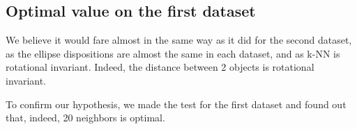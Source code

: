\subsection{Optimal value on the first dataset}
We believe it would fare almost in the same way as it did for the second dataset, as the ellipse dispositions are almost the same in each dataset, and as k-NN is rotational invariant. Indeed, the distance between 2 objects is rotational invariant.\par
To confirm our hypothesis, we made the test for the first dataset and found out that, indeed, 20 neighbors is optimal.

